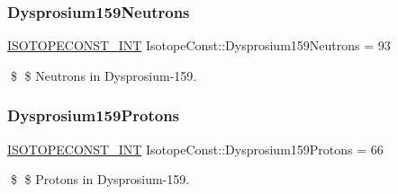 \subsubsection{\texorpdfstring{Dysprosium159\+Neutrons}{Dysprosium159Neutrons}}
{\footnotesize\ttfamily \mbox{\hyperlink{group___isotope_const-_macros_ga5f18360b3e99483a35c32d789e62621c}{I\+S\+O\+T\+O\+P\+E\+C\+O\+N\+S\+T\+\_\+\+I\+NT}} Isotope\+Const\+::\+Dysprosium159\+Neutrons = 93}

\$ \$ Neutrons in Dysprosium-\/159. \mbox{\label{group___isotope_const-_dysprosium-_dy159_ga24c67bcb73e387e828ec18a04550b851}} 
\subsubsection{\texorpdfstring{Dysprosium159\+Protons}{Dysprosium159Protons}}
{\footnotesize\ttfamily \mbox{\hyperlink{group___isotope_const-_macros_ga5f18360b3e99483a35c32d789e62621c}{I\+S\+O\+T\+O\+P\+E\+C\+O\+N\+S\+T\+\_\+\+I\+NT}} Isotope\+Const\+::\+Dysprosium159\+Protons = 66}

\$ \$ Protons in Dysprosium-\/159. 